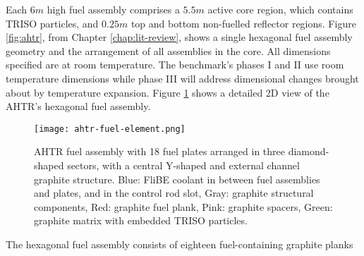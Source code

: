 Each $6m$ high fuel assembly comprises a $5.5m$ active core region, which contains
\gls{TRISO} particles, and $0.25m$ top and bottom non-fuelled reflector regions.
Figure \ref{fig:ahtr}, from Chapter \ref{chap:lit-review}, shows a single 
hexagonal fuel assembly geometry and the arrangement of all assemblies in the core.
All dimensions specified are at room temperature. 
The benchmark's phases I and II use room temperature dimensions while phase III 
will address dimensional changes brought about by temperature expansion. 
Figure \ref{fig:ahtr-fuel-assembly} shows a detailed 2D view of the 
\gls{AHTR}'s hexagonal fuel assembly. 
\begin{figure}[]
    \centering
    \texttt{[image: ahtr-fuel-element.png]} 
            \hspace{0.5cm}
    \caption{\acrlong{AHTR} fuel assembly with 18 fuel plates arranged in 
    three diamond-shaped sectors, with a central Y-shaped and external channel 
    graphite structure. Blue: FliBE coolant in between fuel assemblies and plates, 
    and in the control rod slot, Gray: graphite structural components, 
    Red: graphite fuel plank, Pink: graphite spacers, Green: graphite matrix 
    with embedded TRISO particles.}
    \label{fig:ahtr-fuel-assembly}
\end{figure}
The hexagonal fuel assembly consists of eighteen fuel-containing graphite planks 
